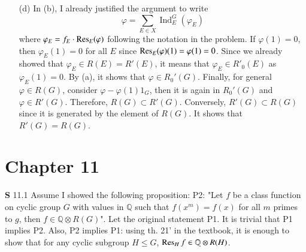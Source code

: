 \documentclass[a4paper, 12pt]{article}
\theoremstyle{Mydefinition}
\theoremstyle{Mytheorem}
\newtheorem{proposition}[statement]{Proposition}
\DeclareMathOperator{\Ind}{Ind}
\begin{document}
\begin{enumerate}
    Now, I'll prove a proposition
    \begin{proposition}
        If $G$ is an elementary group, then $R(G)=R'(G)$.
    \end{proposition}
    \begin{proof}
    Let's use induction on $\abs{G}$. If $\abs{G}=1$, then it is trivial, so let's assume that the statement is true for $\abs{G}<n$ for some $n\in\mathbb{N}_{\geq 2}$. It is enough to show that $R(G)\subset R'(G)$. Since $[G:H]$ is prime order, it is abelian, cf. \textit{Abstract Algebra}, Dummit and Foote, Section 4.3 theorem 8, so we can apply (b). By induction, we know that $R(H)=R'(H)$ since $H$ are all proper elementary subgroup of $G$, so $\Ind_H^G(R(H))\subset R'(G)$. Since $G$ is an elementary subgroup, by setting $E=G$ in the generating element $\Ind_E^G(\alpha-1_E)$ of $R'_0(G)$ with $1_G$, we know that any degree 1 character of $G$ is contained in $R'(G)$. Therefore, it shows that $R(G)\subset R'(G)$ and we get $R(G)=R'(G)$.
    \end{proof}
    \item[(d)] In (b), I already justified the argument to write
    \begin{equation}
        \varphi = \sum_{E\in X} \Ind_E^G(\varphi_E)
    \end{equation}
    where $\varphi_E = f_E\cdot \Res_E(\varphi)$ following the notation in the problem. If $\varphi(1)=0$, then $\varphi_E(1)=0$ for all $E$ since $\Res_E(\varphi)(1) = \varphi(1)=0$. Since we already showed that $\varphi_E\in R(E) = R'(E)$, it means that $\varphi_E\in R'_0(E)$ as $\varphi_E(1)=0$. By (a), it shows that $\varphi\in R_0'(G)$. Finally, for general $\varphi\in R(G)$, consider $\varphi-\varphi(1)1_G$, then it is again in $R_0'(G)$ and $\varphi\in R'(G)$. Therefore, $R(G)\subset R'(G)$. Conversely, $R'(G)\subset R(G)$ since it is generated by the element of $R(G)$. It shows that $R'(G)=R(G)$.
\end{enumerate}

\newpage

\section{Chapter 11}

\noindent \textbf{S} 11.1
Assume I showed the following proposition: P2: "Let $f$ be a class function on cyclic group $G$ with values in $\mathbb{Q}$ such that $f(x^m)=f(x)$ for all $m$ primes to $g$, then $f\in \mathbb{Q}\otimes R(G)$". Let the original statement P1. It is trivial that P1 implies P2. Also, P2 implies P1: using th. 21' in the textbook, it is enough to show that for any cyclic subgroup $H\leq G$, $\Res_H f\in \mathbb{Q}\otimes R(H)$. 
\end{document}
